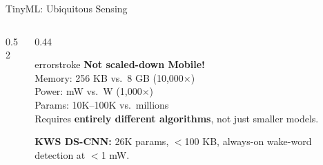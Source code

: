 \documentclass[aspectratio=169, 12pt]{beamer}
\begin{document}
\begin{frame}{TinyML: Ubiquitous Sensing}
\begin{columns}[T]
\begin{column}{0.52\textwidth}
    \vspace{0.1cm}
  \end{column}
  \begin{column}{0.44\textwidth}
    \vspace{0.2cm}
    \begin{mlsyscard}{errorstroke}
    \textbf{Not scaled-down Mobile!}\\[0.1cm]
    {\footnotesize
    Memory: 256 KB vs.\ 8 GB (10,000$\times$)\\
    Power: mW vs.\ W (1,000$\times$)\\
    Params: 10K--100K vs.\ millions\\[0.1cm]
    Requires \textbf{entirely different algorithms}, not just smaller models.}
    \end{mlsyscard}

    \vspace{0.1cm}
    {\footnotesize\textbf{KWS DS-CNN:} 26K params, $<$100 KB, always-on wake-word detection at $<$1 mW.}
  \end{column}
\end{columns}

\end{frame}
\end{document}
